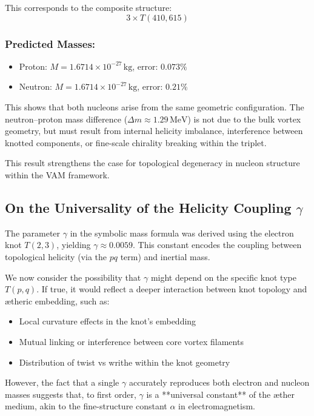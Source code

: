\documentclass[12pt]{article}
\begin{document}
    This corresponds to the composite structure:
    \[
        \boxed{3 \times T(410, 615)}
    \]

    \subsubsection*{Predicted Masses:}
    \begin{itemize}
        \item Proton: \( M = 1.6714 \times 10^{-27} \, \text{kg} \), error: \( 0.073\% \)
        \item Neutron: \( M = 1.6714 \times 10^{-27} \, \text{kg} \), error: \( 0.21\% \)
    \end{itemize}

    This shows that both nucleons arise from the same geometric configuration. The neutron–proton mass difference (\( \Delta m \approx 1.29 \, \text{MeV} \)) is not due to the bulk vortex geometry, but must result from internal helicity imbalance, interference between knotted components, or fine-scale chirality breaking within the triplet.

    This result strengthens the case for topological degeneracy in nucleon structure within the VAM framework.

    \subsection*{On the Universality of the Helicity Coupling \( \gamma \)}
    The parameter \( \gamma \) in the symbolic mass formula was derived using the electron knot \( T(2,3) \), yielding \( \gamma \approx 0.0059 \). This constant encodes the coupling between topological helicity (via the \( pq \) term) and inertial mass.

    We now consider the possibility that \( \gamma \) might depend on the specific knot type \( T(p,q) \). If true, it would reflect a deeper interaction between knot topology and ætheric embedding, such as:
    \begin{itemize}
        \item Local curvature effects in the knot's embedding
        \item Mutual linking or interference between core vortex filaments
        \item Distribution of twist vs writhe within the knot geometry
    \end{itemize}

    However, the fact that a single \( \gamma \) accurately reproduces both electron and nucleon masses suggests that, to first order, \( \gamma \) is a **universal constant** of the æther medium, akin to the fine-structure constant \( \alpha \) in electromagnetism.
\end{document}
